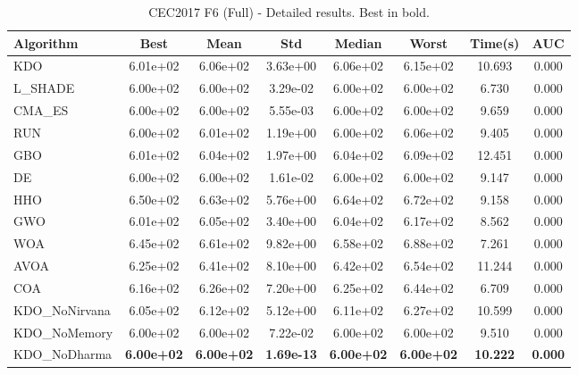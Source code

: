\begin{table}[H]
\centering\small
\caption{CEC2017 F6 (Full) - Detailed results. Best in bold.}
\label{tab:cec2017_F6}
\begin{tabular}{lccccccc}
\toprule
\textbf{Algorithm} & \textbf{Best} & \textbf{Mean} & \textbf{Std} & \textbf{Median} & \textbf{Worst} & \textbf{Time(s)} & \textbf{AUC} \\
\midrule
KDO & 6.01e+02 & 6.06e+02 & 3.63e+00 & 6.06e+02 & 6.15e+02 & 10.693 & 0.000 \\
L_SHADE & 6.00e+02 & 6.00e+02 & 3.29e-02 & 6.00e+02 & 6.00e+02 & 6.730 & 0.000 \\
CMA_ES & 6.00e+02 & 6.00e+02 & 5.55e-03 & 6.00e+02 & 6.00e+02 & 9.659 & 0.000 \\
RUN & 6.00e+02 & 6.01e+02 & 1.19e+00 & 6.00e+02 & 6.06e+02 & 9.405 & 0.000 \\
GBO & 6.01e+02 & 6.04e+02 & 1.97e+00 & 6.04e+02 & 6.09e+02 & 12.451 & 0.000 \\
DE & 6.00e+02 & 6.00e+02 & 1.61e-02 & 6.00e+02 & 6.00e+02 & 9.147 & 0.000 \\
HHO & 6.50e+02 & 6.63e+02 & 5.76e+00 & 6.64e+02 & 6.72e+02 & 9.158 & 0.000 \\
GWO & 6.01e+02 & 6.05e+02 & 3.40e+00 & 6.04e+02 & 6.17e+02 & 8.562 & 0.000 \\
WOA & 6.45e+02 & 6.61e+02 & 9.82e+00 & 6.58e+02 & 6.88e+02 & 7.261 & 0.000 \\
AVOA & 6.25e+02 & 6.41e+02 & 8.10e+00 & 6.42e+02 & 6.54e+02 & 11.244 & 0.000 \\
COA & 6.16e+02 & 6.26e+02 & 7.20e+00 & 6.25e+02 & 6.44e+02 & 6.709 & 0.000 \\
KDO_NoNirvana & 6.05e+02 & 6.12e+02 & 5.12e+00 & 6.11e+02 & 6.27e+02 & 10.599 & 0.000 \\
KDO_NoMemory & 6.00e+02 & 6.00e+02 & 7.22e-02 & 6.00e+02 & 6.00e+02 & 9.510 & 0.000 \\
KDO_NoDharma & \textbf{6.00e+02} & \textbf{6.00e+02} & \textbf{1.69e-13} & \textbf{6.00e+02} & \textbf{6.00e+02} & \textbf{10.222} & \textbf{0.000} \\
\bottomrule
\end{tabular}
\end{table}
